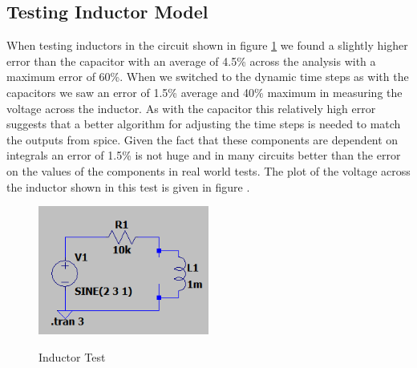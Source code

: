 \documentclass{article}
\begin{document}
\subsection{Testing Inductor Model}
When testing inductors in the circuit shown in figure \ref{fig:InductorTest1} we found a slightly higher error than the capacitor with an average of 4.5\% across the analysis with a maximum error of 60\%. When we switched to the dynamic time steps as with the capacitors we saw an error of 1.5\% average and 40\% maximum in measuring the voltage across the inductor. As with the capacitor this relatively high error suggests that a better algorithm for adjusting the time steps is needed to match the outputs from spice. Given the fact that these components are dependent on integrals an error of 1.5\% is not huge and in many circuits better than the error on the values of the components in real world tests. The plot of the voltage across the inductor shown in this test is given in figure .
\begin{figure}[h]
    \caption{Inductor Test}
    \centering
    \includegraphics[width=0.5\textwidth]{images/InductorTest1.png}
    \label{fig:InductorTest1}
\end{figure}
\newpage
\end{document}
